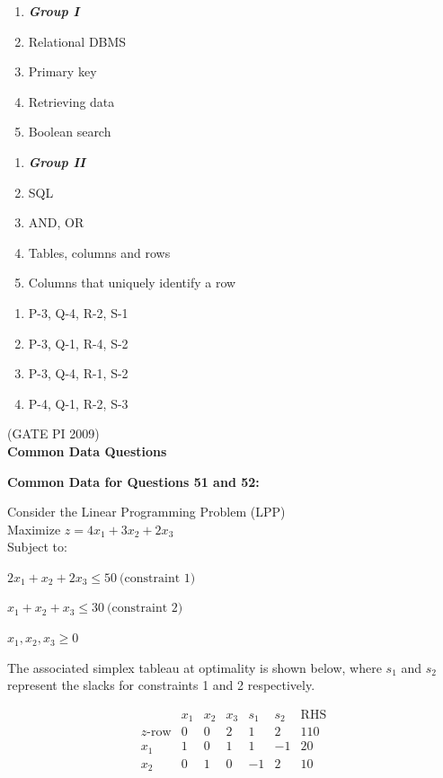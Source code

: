\documentclass[journal,12pt,onecolumn]{IEEEtran}
\theoremstyle{remark}
\begin{document}
\begin{enumerate}
\begin{multicols}{2}
\begin{enumerate}[label=\Alph*.]
    \item[]  \textit{\textbf{Group I}}
    \item Relational DBMS
    \item Primary key
    \item Retrieving data
    \item Boolean search
\end{enumerate}
\columnbreak
\begin{enumerate}[label=\arabic*.]
    \item[] \textit{\textbf{Group II}}
    \item SQL
    \item AND, OR
    \item Tables, columns and rows
    \item Columns that uniquely identify a row
\end{enumerate}
\end{multicols}


\begin{multicols}{2}
\begin{enumerate}
    \item P-3, Q-4, R-2, S-1
    \item P-3, Q-1, R-4, S-2
    \item P-3, Q-4, R-1, S-2
    \item P-4, Q-1, R-2, S-3 
\end{enumerate}
\end{multicols}
\hfill (GATE PI 2009) \\

\textbf{\large{Common Data Questions}}

\textbf{Common Data for Questions 51 and 52:}

Consider the Linear Programming Problem (LPP)\\
Maximize  $ z = 4x_1 + 3x_2 + 2x_3 $ \\
Subject to:

\centerline{ $2x_1 + x_2 + 2x_3 \leq 50\  \text{(constraint 1)}\ $ } 
\centerline {$ x_1 + x_2 + x_3 \leq 30\  \text{(constraint 2)} $}
\centerline{$x_1, x_2, x_3 \geq 0 $}

The associated simplex tableau at optimality is shown below, where $s_1$ and $s_2$ represent the slacks for constraints 1 and 2 respectively.

$$\begin{array}{c|ccccc|c}
\text{} & x_1 & x_2 & x_3 & s_1 & s_2 & \text{RHS} \\ \hline
z\text{-row} & 0 & 0 & 2 & 1 & 2 & 110 \\ \hline
x_1 & 1 & 0 & 1 & 1 & -1 & 20 \\
x_2 & 0 & 1 & 0 & -1 & 2 & 10 \\
\end{array}
$$


\end{enumerate}
\end{document}
